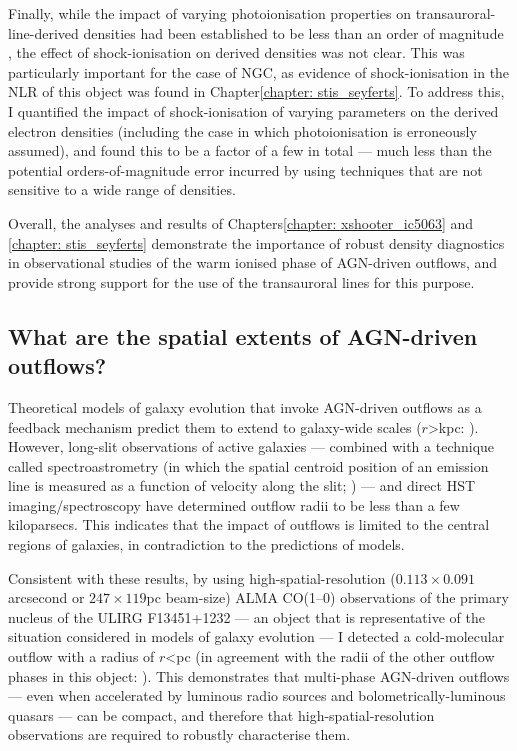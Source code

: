 Finally, while the impact of varying photoionisation properties on transauroral-line-derived densities had been established to be less than an order of magnitude \citep{Santoro2020}, the effect of shock-ionisation on derived densities was not clear. This was particularly important for the case of NGC, as evidence of shock-ionisation in the NLR of this object was found in Chapter\;\ref{chapter: stis_seyferts}. To address this, I quantified the impact of shock-ionisation of varying parameters on the derived electron densities (including the case in which photoionisation is erroneously assumed), and found this to be a factor of a few in total --- much less than the potential orders-of-magnitude error incurred by using techniques that are not sensitive to a wide range of densities.

Overall, the analyses and results of Chapters\;\ref{chapter: xshooter_ic5063} and \ref{chapter: stis_seyferts} demonstrate the importance of robust density diagnostics in observational studies of the warm ionised phase of AGN-driven outflows, and provide strong support for the use of the transauroral lines for this purpose.

\subsection{What are the spatial extents of AGN-driven outflows?}
\label{conclusions_and_future_work: conclusions: spatial_extents}

Theoretical models of galaxy evolution that invoke AGN-driven outflows as a feedback mechanism predict them to extend to galaxy-wide scales ($r$\;\textgreater{}\;kpc: \citealt{Silk1998, DiMatteo2005, Curtis2016, Zubovas2023}). However, long-slit observations of active galaxies --- combined with a technique called spectroastrometry (in which the spatial centroid position of an emission line is measured as a function of velocity along the slit; \citealt{Carniani2015, VillarMartin2016, Santoro2020}) --- and direct HST imaging/spectroscopy \citep{Fischer2018, Tadhunter2018} have determined outflow radii to be less than a few kiloparsecs. This indicates that the impact of outflows is limited to the central regions of galaxies, in contradiction to the predictions of models.

Consistent with these results, by using high-spatial-resolution ($0.113\times0.091$\;arcsecond or $247\times119$\;pc beam-size) ALMA CO(1--0) observations of the primary nucleus of the ULIRG F13451+1232 --- an object that is representative of the situation considered in models of galaxy evolution --- I detected a cold-molecular outflow with a radius of $r$\;\textless{}\;pc (in agreement with the radii of the other outflow phases in this object: \citealt{Morganti2013_4c1250, Tadhunter2018}). This demonstrates that multi-phase AGN-driven outflows --- even when accelerated by luminous radio sources and bolometrically-luminous quasars --- can be compact, and therefore that high-spatial-resolution observations are required to robustly characterise them.

